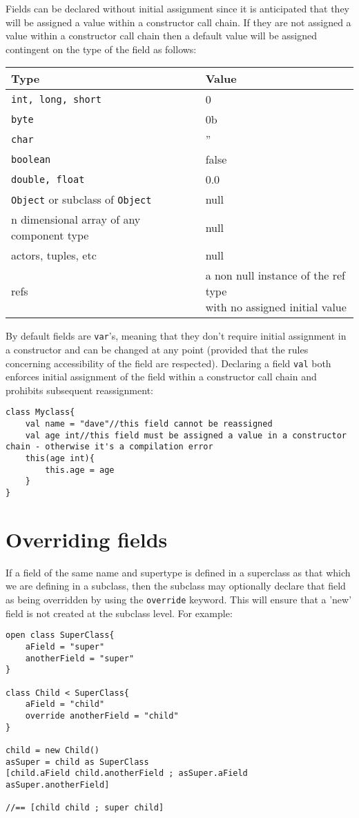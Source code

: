 \documentclass[conc-doc]{subfiles}
\begin{document}
Fields can be declared without initial assignment since it is anticipated that they will be assigned a value within a constructor call chain. If they are not assigned a value within a constructor call chain then a default value will be assigned contingent on the type of the field as follows:


\begin{table}[H]
	\centering
	\begin{tabular}{ll}
			\hline
			Type&Value\\
			\hline
			\lstinline!int, long, short!&0\\
			\lstinline!byte!&0b\\
			\lstinline!char!&''\\
			\lstinline!boolean!&false\\
			\lstinline!double, float!&0.0\\
			\lstinline!Object! or subclass of \lstinline!Object!&null\\
			n dimensional array of any component type&null\\
			actors, tuples, etc&null\\
			refs&\bettershortstack{a non null instance of the ref type\\with no assigned initial value}\\
			\hline
	\end{tabular}%
\end{table}


By default fields are \lstinline{var}'s, meaning that they don't require initial assignment in a constructor and can be changed at any point (provided that the rules concerning accessibility of the field are respected). Declaring a field \lstinline{val} both enforces initial assignment of the field within a constructor call chain and prohibits subsequent reassignment:

\begin{lstlisting}
class Myclass{
	val name = "dave"//this field cannot be reassigned
	val age int//this field must be assigned a value in a constructor chain - otherwise it's a compilation error
	this(age int){
		this.age = age
	}
}
\end{lstlisting}

\section{Overriding fields}
If a field of the same name and supertype is defined in a superclass as that which we are defining in a subclass, then the subclass may optionally declare that field as being overridden by using the \lstinline{override} keyword. This will ensure that a 'new' field is not created at the subclass level. For example:
\begin{lstlisting}
open class SuperClass{
	aField = "super"
	anotherField = "super"
}

class Child < SuperClass{
	aField = "child"
	override anotherField = "child"
}

child = new Child()
asSuper = child as SuperClass
[child.aField child.anotherField ; asSuper.aField asSuper.anotherField]

//== [child child ; super child]
\end{lstlisting}
\end{document}
